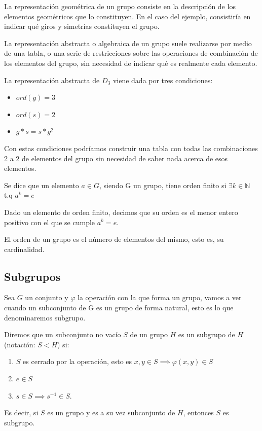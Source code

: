 \documentclass[nochap]{apuntes}
\begin{document}
 La representación geométrica de un grupo consiste en la descripción de los elementos geométricos que lo constituyen. En el caso del ejemplo, consistiría en indicar qué giros y simetrías constituyen el grupo.
 
 La representación abstracta o algebraica de un grupo suele realizarse por medio de una tabla, o una serie de restricciones sobre las operaciones de combinación de los elementos del grupo, sin necesidad de indicar qué es realmente cada elemento.
 \begin{example}
  La representación abstracta de $D_{3}$  viene dada por tres condiciones:
 \begin{itemize}
  \item $ord(g)=3$
  \item $ord(s)=2$
  \item $g\ast s=s\ast g^{2}$
 \end{itemize}
 
Con estas condiciones podríamos construir una tabla con todas las combinaciones 2 a 2 de elementos del grupo sin necesidad
 de saber nada acerca de esos elementos.
 \end{example}
 
 \begin{defn}
  Se dice que un elemento $a\in G$, siendo G un grupo, tiene orden finito si $\exists k\in\mathbb{N}$  t.q  $a^{k}=e$
 \end{defn}
 
 \begin{defn}
  Dado un elemento de orden finito, decimos que su orden es el menor entero positivo con el que se cumple $a^{k}=e$.
 \end{defn}
 
 \begin{defn}
 El orden de un grupo es el número de elementos del mismo, esto es, su cardinalidad.
 \end{defn}
 
\subsection{Subgrupos}
 Sea $G$ un conjunto y $\varphi$  la operación con la que forma un grupo, vamos a ver cuando un subconjunto de G es un grupo de forma natural,
 esto es lo que denominaremos subgrupo.
 
 \begin{defn}[Subgrupo]
  Diremos que un subconjunto no vacío $S$ de un grupo $H$ es un subgrupo de $H$ (notación: $S < H$) si:
  \begin{enumerate}
   \item $S$ es cerrado por la operación, esto es $x,y \in S \implies \varphi(x,y) \in S$
   \item $e \in S$
   \item $s \in S \implies s^{-1}\in S$.
  \end{enumerate}
  
  Es decir, si $S$ es un grupo y es a su vez subconjunto de $H$, entonces $S$ es subgrupo.
 \end{defn}
 
\end{document}
